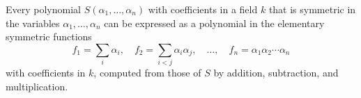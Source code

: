 Every polynomial $S(\alpha_1, \ldots, \alpha_n)$ with coefficients in a field $k$ that is symmetric in the variables $\alpha_1, \ldots, \alpha_n$ can be expressed as a polynomial in the elementary symmetric functions
$$f_1 = \sum_i \alpha_i, \quad f_2 = \sum_{i<j} \alpha_i \alpha_j, \quad \ldots, \quad f_n = \alpha_1 \alpha_2 \cdots \alpha_n$$
with coefficients in $k$, computed from those of $S$ by addition, subtraction, and multiplication.
